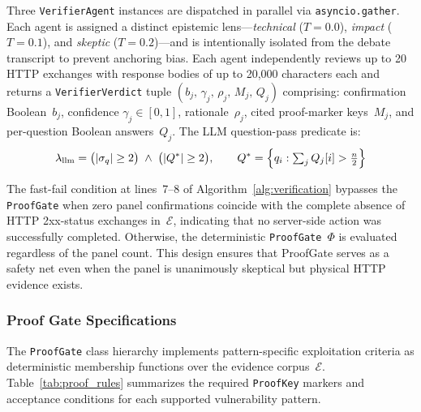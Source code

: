 Three \texttt{VerifierAgent} instances are dispatched in parallel via
\texttt{asyncio.gather}.
Each agent is assigned a distinct epistemic lens---\textit{technical}
($T = 0.0$), \textit{impact} ($T = 0.1$), and \textit{skeptic}
($T = 0.2$)---and is intentionally isolated from the debate transcript
to prevent anchoring bias.
Each agent independently reviews up to 20 HTTP exchanges with response
bodies of up to 20,000 characters each and returns a
\texttt{VerifierVerdict} tuple
$(b_j,\, \gamma_j,\, \rho_j,\, M_j,\, Q_j)$
comprising: confirmation Boolean~$b_j$, confidence
$\gamma_j \in [0,1]$, rationale~$\rho_j$, cited proof-marker
keys~$M_j$, and per-question Boolean answers~$Q_j$.
The LLM question-pass predicate is:
\begin{equation}
  \lambda_{\mathrm{llm}}
  = \bigl(|\sigma_q| \geq 2\bigr)
  \;\wedge\;
  \bigl(|Q^*| \geq 2\bigr),
  \qquad
  Q^* = \Bigl\{q_i : \textstyle\sum_j Q_j[i] > \tfrac{n}{2}\Bigr\}
  \label{eq:llm_pass}
\end{equation}

The fast-fail condition at lines~7--8 of Algorithm~\ref{alg:verification}
bypasses the \texttt{ProofGate} when zero panel confirmations coincide
with the complete absence of HTTP 2xx-status exchanges in~$\mathcal{E}$,
indicating that no server-side action was successfully completed.
Otherwise, the deterministic \texttt{ProofGate}~$\Phi$ is evaluated
regardless of the panel count.
This design ensures that ProofGate serves as a safety net even when
the panel is unanimously skeptical but physical HTTP evidence exists.

\subsubsection{Proof Gate Specifications}

The \texttt{ProofGate} class hierarchy implements pattern-specific
exploitation criteria as deterministic membership functions over the
evidence corpus~$\mathcal{E}$.
Table~\ref{tab:proof_rules} summarizes the required
\texttt{ProofKey} markers and acceptance conditions for each supported
vulnerability pattern.

